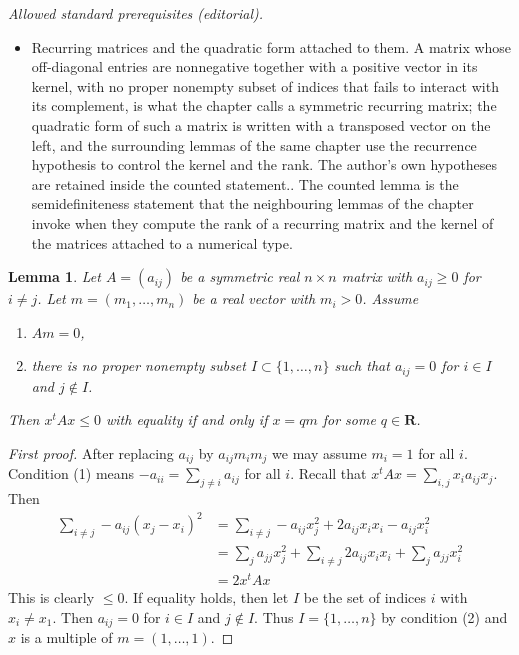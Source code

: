 \documentclass[10pt,a4paper]{amsart}
\theoremstyle{plain}
\newtheorem{lemma}[subsection]{Lemma}
\theoremstyle{definition}
\theoremstyle{remark}
\numberwithin{equation}{subsection}
\begin{document}
\noindent\textit{Allowed standard prerequisites (editorial).}\begin{itemize}
\item Recurring matrices and the quadratic form attached to them. A matrix whose off-diagonal entries are nonnegative together with a positive vector in its kernel, with no proper nonempty subset of indices that fails to interact with its complement, is what the chapter calls a symmetric recurring matrix; the quadratic form of such a matrix is written with a transposed vector on the left, and the surrounding lemmas of the same chapter use the recurrence hypothesis to control the kernel and the rank. The author's own hypotheses are retained inside the counted statement.. The counted lemma is the semidefiniteness statement that the neighbouring lemmas of the chapter invoke when they compute the rank of a recurring matrix and the kernel of the matrices attached to a numerical type.
\end{itemize}\medskip
\begin{lemma}
\label{lemma-recurring-symmetric-real}
Let $A = (a_{ij})$ be a symmetric real $n \times n$ matrix with
$a_{ij} \geq 0$ for $i \not = j$.
Let $m = (m_1, \ldots, m_n)$ be a real vector with $m_i > 0$.
Assume
\begin{enumerate}
\item $Am = 0$,
\item there is no proper nonempty subset $I \subset \{1, \ldots, n\}$
such that $a_{ij} = 0$ for $i \in I$ and $j \not \in I$.
\end{enumerate}
Then $x^t A x \leq 0$ with equality if and only if $x = qm$
for some $q \in \mathbf{R}$.
\end{lemma}

\begin{proof}[First proof]
After replacing $a_{ij}$ by $a_{ij}m_im_j$ we may assume $m_i = 1$
for all $i$. Condition (1) means $-a_{ii} = \sum_{j \not = i} a_{ij}$
for all $i$. Recall that $x^tAx = \sum_{i, j} x_ia_{ij}x_j$.
Then
\begin{align*}
\sum\nolimits_{i \not = j} -a_{ij}(x_j - x_i)^2 & =
\sum\nolimits_{i \not = j} -a_{ij}x_j^2 + 2a_{ij}x_ix_i - a_{ij}x_i^2 \\
& =
\sum\nolimits_j a_{jj} x_j^2 +
\sum\nolimits_{i \not = j} 2a_{ij}x_ix_i +
\sum\nolimits_j a_{jj} x_i^2 \\
& = 2x^tAx
\end{align*}
This is clearly $\leq 0$. If equality holds, then let $I$ be the set
of indices $i$ with $x_i \not = x_1$. Then $a_{ij} = 0$ for $i \in I$
and $j \not \in I$. Thus $I = \{1, \ldots, n\}$ by condition (2) and
$x$ is a multiple of $m = (1, \ldots, 1)$.
\end{proof}
\end{document}
